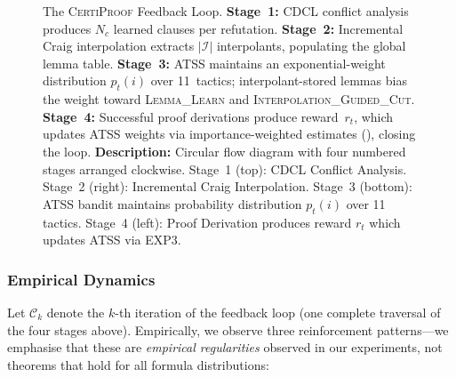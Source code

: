 \documentclass[acmtocl,review,anonymous]{acmart}
\newcommand{\CP}{\textsc{CertiProof}}
\begin{document}
\begin{figure}[t]
  \caption{The \CP{} Feedback Loop.  \textbf{Stage~1:} CDCL conflict
    analysis produces $N_c$ learned clauses per refutation.
    \textbf{Stage~2:} Incremental Craig interpolation extracts $|\mathcal{I}|$
    interpolants, populating the global lemma table.
    \textbf{Stage~3:} ATSS maintains an exponential-weight distribution
    $p_t(i)$ over 11~tactics; interpolant-stored lemmas bias the
    weight toward \textsc{Lemma\_Learn} and
    \textsc{Interpolation\_Guided\_Cut}.
    \textbf{Stage~4:} Successful proof derivations produce reward~$r_t$,
    which updates ATSS weights via importance-weighted estimates
    (), closing the loop.
    \textbf{Description:} Circular flow diagram with four numbered
    stages arranged clockwise. Stage~1 (top): CDCL Conflict Analysis.
    Stage~2 (right): Incremental Craig Interpolation. Stage~3 (bottom):
    ATSS bandit maintains probability distribution $p_t(i)$ over 11
    tactics. Stage~4 (left): Proof Derivation produces reward $r_t$
    which updates ATSS via EXP3.}
  \label{fig:virtuous-cycle}
\end{figure}

\subsubsection*{Empirical Dynamics}

Let $\mathcal{C}_k$ denote the $k$-th iteration of the feedback loop
(one complete traversal of the four stages above).  Empirically, we
observe three reinforcement patterns---we emphasise that these are
\emph{empirical regularities} observed in our experiments, not
theorems that hold for all formula distributions:
\end{document}
